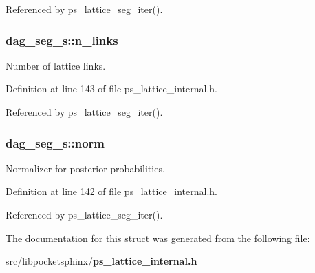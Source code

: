 \-Referenced by ps\-\_\-lattice\-\_\-seg\-\_\-iter().

\subsubsection[{n\-\_\-links}]{ {\bf dag\-\_\-seg\-\_\-s\-::n\-\_\-links}}\label{structdag__seg__s_a2a858ea6ef051074be2bd1716a4939fb}


\-Number of lattice links. 



\-Definition at line 143 of file ps\-\_\-lattice\-\_\-internal.\-h.



\-Referenced by ps\-\_\-lattice\-\_\-seg\-\_\-iter().

\subsubsection[{norm}]{ {\bf dag\-\_\-seg\-\_\-s\-::norm}}\label{structdag__seg__s_a4517656eeaa40d33109d39a251a75dea}


\-Normalizer for posterior probabilities. 



\-Definition at line 142 of file ps\-\_\-lattice\-\_\-internal.\-h.



\-Referenced by ps\-\_\-lattice\-\_\-seg\-\_\-iter().



\-The documentation for this struct was generated from the following file\-:\begin{DoxyCompactItemize}
\item 
src/libpocketsphinx/{\bf ps\-\_\-lattice\-\_\-internal.\-h}\end{DoxyCompactItemize}
